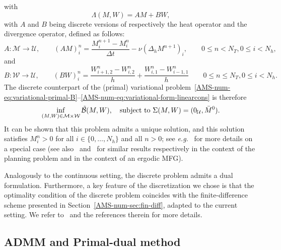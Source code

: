 \documentclass{amsproc}
\theoremstyle{definition}
\theoremstyle{remark}
\numberwithin{equation}{section}
\newcommand{\cB}{{\mathcal B}}
\newcommand{\cM}{{\mathcal M}}
\newcommand{\cU}{{\mathcal U}}
\newcommand{\cW}{{\mathcal W}}
\begin{document}
      with 
      $$
      	\Lambda(M,W) = AM + BW,
	$$
	with $A$ and $B$ being discrete versions of respectively the heat operator and the divergence operator, defined as follows:
\begin{equation}
\label{eq:def-op-A}
	A: \cM \to \cU,
	\qquad
	(AM)^{n}_i = \frac{M^{n+1}_i - M^{n}_i}{\Delta t} - \nu (\Delta_h M^{n+1})_i, \qquad 0 \le n < N_T, 0 \le i < N_h,
\end{equation}
and
\begin{equation}
\label{eq:def-op-B}
	B: \cW \to \cU,
	\qquad
	(BW)^{n}_i = \frac{W^{n}_{i+1,2} - W^{n}_{i,2}}{h} + \frac{W^{n}_{i,1} - W^{n}_{i-1,1}}{h} 
              \qquad 0 \le n \le N_T, 0 \le i < N_h.
\end{equation}
The discrete counterpart of the (primal) variational problem~\eqref{AMS-num-eq:variational-primal-B}--\eqref{AMS-num-eq:variational-form-linearcons} is therefore
\begin{equation}
\label{eq:discrete-pb-short}
	\inf_{\substack{(M,W) \in \cM \times \cW}} \tilde\cB(M,W),  \quad \hbox {subject to } \Sigma(M,W) = (0_\cU, \bar M^0).
\end{equation}
It can be shown that this problem admits a unique solution, and this solution satisfies $M^n_i >0$ for all $i \in \{0, \dots, N_h\}$ and all $n>0$; see \textit{e.g.}~\cite[Theorem 3.1]{BricenoAriasetalCEMRACS2017} for more details on a special case (see also~\cite[Section 6]{MR3135339} and~\cite[Theorem 2.1]{MR3772008}  for similar results respectively in the context of the planning problem and in the context of an ergodic MFG).


Analogously to the continuous setting, the discrete problem admits a dual formulation. Furthermore, a key feature of the discretization we chose is that the optimality condition of the discrete problem coincides with the finite-difference scheme presented in Section~\ref{AMS-num-sec:fin-diff}, adapted to the current setting. We refer to~\cite[Section 3]{achdoulauriere-2020-mfg-numerical} and the references therein for more details.









\subsection{ADMM and Primal-dual method}
\end{document}
